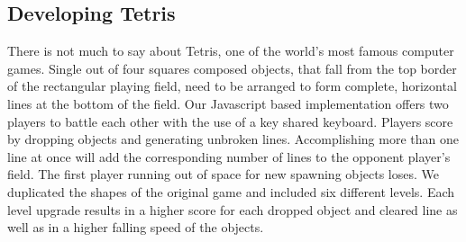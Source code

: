 \subsection{Developing Tetris}
There is not much to say about Tetris, one of the world's most famous computer games. Single out of four squares composed objects, that fall from the top border of the rectangular playing field, need to be arranged to form complete, horizontal lines at the bottom of the field. Our Javascript based implementation offers two players to battle each other with the use of a key shared keyboard. Players score by dropping objects and generating unbroken lines. Accomplishing more than one line at once will add the corresponding number of lines to the opponent player's field. The first player running out of space for new spawning objects loses. We duplicated the shapes of the original game and included six different levels. Each level upgrade results in a higher score for each dropped object and cleared line as well as in a higher falling speed of the objects.

